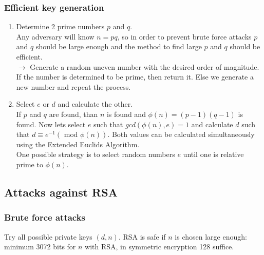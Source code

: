 \documentclass[12pt]{article}
\begin{document}
 \subsubsection{Efficient key generation}
 \begin{enumerate}
 	\item Determine 2 prime numbers $p$ and $q$.\\
 	Any adversary will know $n=pq$, so in order to prevent brute force attacks $p$ and $q$ should be large enough and the method to find large $p$ and $q$ should be efficient.\\
 	$\rightarrow$ Generate a random uneven number with the desired order of magnitude. If the number is determined to be prime, then return it. Else we generate a new number and repeat the process.
 	\item Select $e$ or $d$ and calculate the other.\\
 	If $p$ and $q$ are found, than $n$ is found and $\phi(n) = (p-1)(q-1)$ is found. Now lets select $e$ such that $gcd(\phi(n), e) = 1$ and calculate $d$ such that $d\equiv e^{-1}(\text{ mod }\phi(n))$. Both values can be calculated simultaneously using the Extended Euclids Algorithm. \\
 	One possible strategy is to select random numbers $e$ until one is relative prime to $\phi(n)$.
 \end{enumerate}
 
 \subsection{Attacks against RSA}
 \subsubsection{Brute force attacks}
 Try all possible private keys $(d, n)$. RSA is safe if $n$ is chosen large enough: minimum 3072 bits for $n$ with RSA, in symmetric encryption 128 suffice.
 
\end{document}
